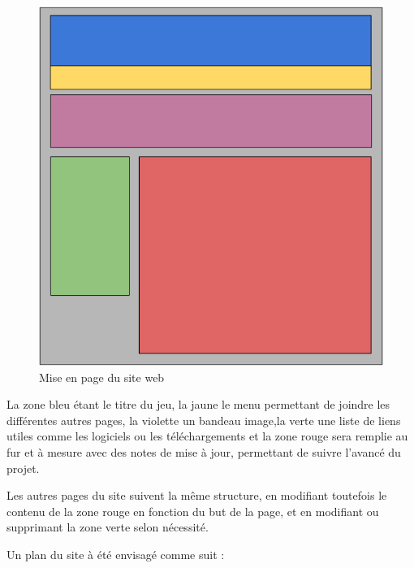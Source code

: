 \documentclass[12pt]{report}
\begin{document}
\begin{figure}[H]
    \centering
    \includegraphics[scale=0.8]{layout_website}
    \caption{Mise en page du site web}
\end{figure}

La zone bleu étant le titre du jeu, la jaune le menu permettant de joindre les différentes autres pages, la violette un bandeau image,la verte une liste de liens utiles comme les logiciels ou les téléchargements et la zone rouge sera remplie au fur et à mesure avec des notes de mise à jour, permettant de suivre l’avancé du projet.

Les autres pages du site suivent la même structure, en modifiant toutefois le contenu de la zone rouge en fonction du but de la page, et en modifiant ou supprimant la zone verte selon nécessité.

Un plan du site à été envisagé comme suit :
\end{document}
